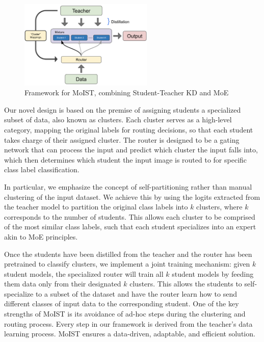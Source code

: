 \documentclass[conference]{IEEEtran}
\begin{document}
\begin{figure}[ht!] %
\centering
\includegraphics[width=2.5in]{figures/MoIST_framework.png}
\caption{Framework for MoIST, combining Student-Teacher KD and MoE}
\label{frameworkMoist}
\end{figure}


Our novel design is based on the premise of assigning students a specialized subset of data, also known as clusters. Each cluster serves as a high-level category, mapping the original labels for routing decisions, so that each student takes charge of their assigned cluster. The router is designed to be a gating network that can process the input and predict which cluster the input falls into, which then determines which student the input image is routed to for specific class label classification.

In particular, we emphasize the concept of self-partitioning rather than manual clustering of the input dataset. We achieve this by using the logits extracted from the teacher model to partition the original class labels into $k$ clusters, where $k$ corresponds to the number of students. This allows each cluster to be comprised of the most similar class labels, such that each student specializes into an expert akin to MoE principles.

Once the students have been distilled from the teacher and the router has been pretrained to classify clusters, we implement a joint training mechanism: given $k$ student models, the specialized router will train all $k$ student models by feeding them data only from their designated $k$ clusters. This allows the students to self-specialize to a subset of the dataset and have the router learn how to send different classes of input data to the corresponding student. One of the key strengths of MoIST is its avoidance of ad-hoc steps during the clustering and routing process. Every step in our framework is derived from the teacher's data learning process. MoIST ensures a data-driven, adaptable, and efficient solution.
\end{document}
